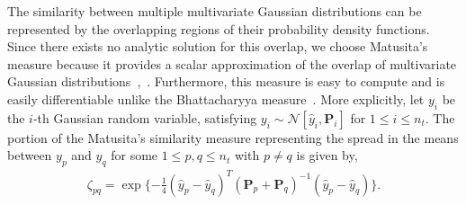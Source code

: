 The similarity between multiple multivariate Gaussian distributions can be represented by the overlapping regions of their probability density functions. Since there exists no analytic solution for this overlap, we choose Matusita's measure because it provides a scalar approximation of the overlap of multivariate Gaussian distributions~\cite{Mat55},~\cite{Coal_k}. Furthermore, this measure is easy to compute and is easily differentiable unlike the Bhattacharyya measure~\cite{Bhatt97}.
More explicitly, let $y_i$ be the $i$-th Gaussian random variable, satisfying $y_i \sim \mathcal{N}[\hat y_i,{\mathbf P}_i]$ for $1\leq i \leq n_t$. The portion of the Matusita's similarity measure representing the spread in the means between $y_p$ and $y_q$ for some $1\leq p,q\leq n_t$ with $p\neq q$ is given by,
\begin{align}
\zeta_{pq}=\exp \{-\frac14(\hat y_{p}- \hat y_{q})^T({\mathbf P}_{p}
+{\mathbf P}_{q})^{-1}(\hat y_{p}-\hat y_{q})\}.\label{eqn:Mat2Est}
\end{align}




